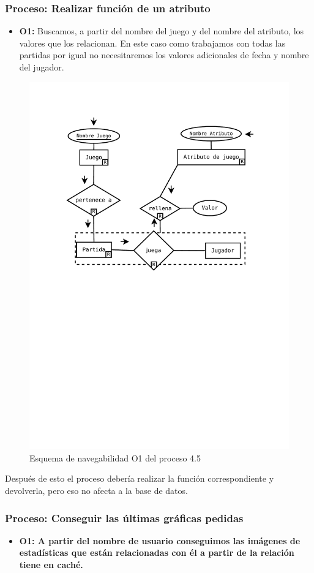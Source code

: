 \subsubsection{Proceso: Realizar función de un atributo}

\begin{itemize}
	\item \textbf{O1:} Buscamos, a partir del nombre del juego y del nombre del atributo, los valores que los relacionan. En este caso como trabajamos con todas las partidas por igual no necesitaremos los valores adicionales de fecha y nombre del jugador.
\end{itemize}

\begin{figure}[H]
	\centering
	\includegraphics[width=0.5\linewidth]{../Diagramas/pdf/OpEstadisticas5.pdf}
	\caption{Esquema de navegabilidad  O1 del proceso 4.5}
	
	\label{fig:O4.5}
\end{figure}

Después de esto el proceso debería realizar la función correspondiente y devolverla, pero eso no afecta a la base de datos.

\subsubsection{Proceso: Conseguir las últimas gráficas pedidas}

\begin{itemize}
	\item \textbf{O1: A partir del nombre de usuario conseguimos las imágenes de estadísticas que están relacionadas con él a partir de la relación tiene en caché.} 
\end{itemize}

